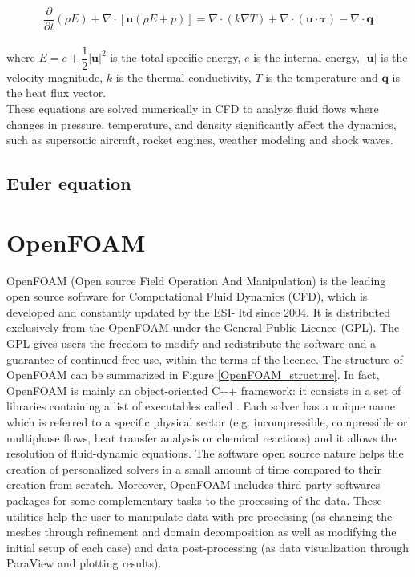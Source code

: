 \documentclass[a5paper]{sapthesis}
\begin{document}
	\begin{equation}
		\dfrac{\partial}{\partial t} \left( \rho E \right) + \nabla \cdot \left[ \mathbf{u} (\rho E + p) \right] = \nabla \cdot \left( k \nabla T \right) + \nabla \cdot (\mathbf{u} \cdot \boldsymbol{\tau}) - \nabla \cdot \mathbf{q}
		\label{energy}
	\end{equation}
	\\
	where $E = e + \dfrac{1}{2} |\mathbf{u}|^2$ is the total specific energy, $e$ is the internal energy, $|\mathbf{u}|$ is the velocity magnitude, $k$ is the thermal conductivity, $T$ is the temperature and $\mathbf{q}$ is the heat flux vector.
	\\	
	These equations are solved numerically in CFD to analyze fluid flows where changes in pressure, temperature, and density significantly affect the dynamics, such as supersonic aircraft, rocket engines, weather modeling and shock waves.
	
	\subsection{Euler equation}
	
	\section{OpenFOAM}
	OpenFOAM (Open source Field Operation And Manipulation) is the leading open source software for Computational Fluid Dynamics (CFD), which is developed and constantly updated by the ESI-\citet{OpenFOAM_ESI} ltd since 2004. It is distributed exclusively from the OpenFOAM \citet{OpenFOAMFoundation} under the General Public Licence (GPL). The GPL gives users the freedom to modify and redistribute the software and a guarantee of continued free use, within the terms of the licence.
	The structure of OpenFOAM  can be summarized in Figure \ref{OpenFOAM_structure}. In fact, OpenFOAM is mainly an object-oriented C++ framework: it consists in a set of libraries containing a list of executables called . Each solver has a unique name which is referred to a specific physical sector (e.g. incompressible, compressible or multiphase flows, heat transfer analysis or chemical reactions) and it allows the resolution of fluid-dynamic equations. The software open source nature helps the creation of personalized solvers in a small amount of time compared to their creation from scratch. Moreover, OpenFOAM includes third party softwares packages for some complementary tasks to the processing of the data. These utilities help the user to  manipulate data with pre-processing (as changing the meshes through refinement and domain decomposition as well as modifying the initial setup of each case) and data post-processing (as data visualization through ParaView and plotting results). 
	
\end{document}
